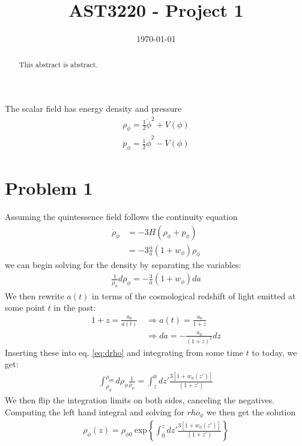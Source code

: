 \documentclass[reprint,english,notitlepage]{revtex4-1}  %
\begin{document}
\title{AST3220 - Project 1}   %
\date{\today}                             %
\noaffiliation                            %
\begin{abstract}                          %
This abstract is abstract.                %
\end{abstract}                            %
\maketitle                                %

The scalar field has energy density and pressure
\begin{align}
	\rho_{\phi} = \frac{1}{2} \dot{\phi}^2 + V(\phi) \label{eq:density} \\
	   p_{\phi} = \frac{1}{2} \dot{\phi}^2 - V(\phi) \label{eq:pressure}
\end{align}
\section{Problem 1}
Assuming the quintessence field follows the continuity equation
\begin{align}
	\dot{\rho}_{\phi} &= -3H\left(\rho_{\phi} + p_{\phi}\right) \\
										&= -3\frac{\dot{a}}{a}\left(1 + w_{\phi}\right)\rho_{\phi}
\end{align}
we can begin solving for the density by separating the variables:
\begin{align}\label{eq:drho}
	\frac{1}{\rho_{\phi}} d\rho_{\phi} = -\frac{3}{a}\left(1+w_{\phi}\right)da
\end{align}
We then rewrite $a(t)$ in terms of the cosmological redshift of light emitted at some point $t$ in the past:
\begin{align}
	1+z = \frac{a_0}{a(t)} \ &\Rightarrow a(t) = \frac{a_0}{1+z} \\
													 &\Rightarrow da  = -\frac{a_0}{(1+z)^2}dz
\end{align}
Inserting these into eq. \ref{eq:drho} and integrating from some time $t$ to
today, we get:
\begin{align}
	\int^{\rho_{\phi0}}_{\rho_{\phi}} d\rho_{\phi} \frac{1}{\rho_{\phi}}
	= \int^{0}_z dz' \frac{3[1+w_\phi (z')]}{(1+z')}
\end{align}
We then flip the integration limits on both sides, canceling the negatives.
Computing the left hand integral and solving for $rho_\phi$ we then get the solution
\begin{align}
	\rho_\phi(z) = \rho_{\phi 0} \
	\mathrm{exp}\left\{ \int^{z}_0 dz' \frac{3[1+w_\phi (z')]}{(1+z')}\right\}
\end{align}
\end{document}
